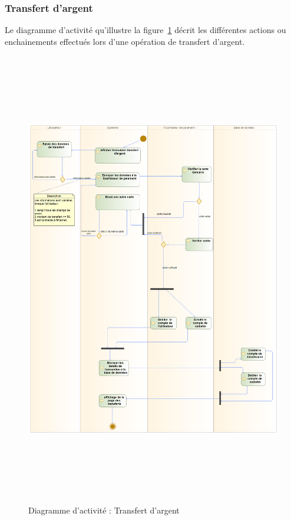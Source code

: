 \subsubsection{Transfert d'argent}
Le diagramme d’activité qu’illustre la figure~\ref{activiteTr} décrit les différentes actions ou enchainements
effectués lors d’une opération de transfert d’argent.
\begin{figure}[h!]
	\includegraphics[width=18cm, height=20cm]{./Template LaTeX/Images/trans_act.png}
	\caption{Diagramme d'activité : Transfert d'argent}
	\label{activiteTr}
\end{figure}

